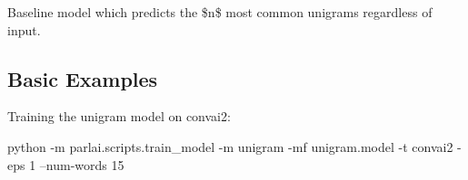 Baseline model which predicts the \$n\$ most common unigrams regardless of input.

\subsection*{Basic Examples}

Training the unigram model on convai2\+:


\begin{DoxyCode}
python -m parlai.scripts.train\_model -m unigram -mf unigram.model -t convai2 -eps 1 --num-words 15
\end{DoxyCode}
 